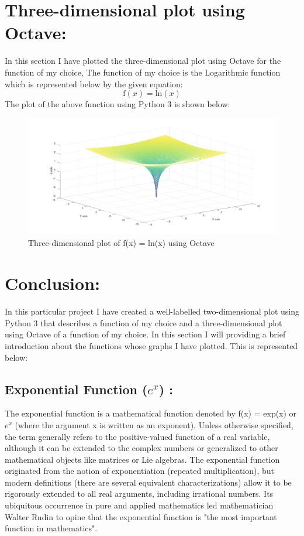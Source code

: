 \documentclass[12pt,a4paper]{article}
\begin{document}
\section{Three-dimensional plot using Octave:}
In this section I have plotted the three-dimensional plot using Octave for the function of my choice, The function of my choice is the Logarithmic function which is represented below by the given equation:
\begin{equation}
    \text{f}(x) = \text{ln}(x)
\end{equation}
The plot of the above function using Python 3 is shown below:
\begin{figure}[!ht]
	\begin{center}
			\includegraphics[scale=0.8]{Figure_2.png}
	\end{center}
	\caption{Three-dimensional plot of f(x) = ln(x) using Octave}
\end{figure}
\section{Conclusion:}
In this particular project I have created a well-labelled two-dimensional plot using Python 3 that describes a function of my choice and a three-dimensional plot using Octave of a function of my choice. In this section I will providing a brief introduction about the functions whose graphs I have plotted. This is represented below:
\subsection{Exponential Function ($e^x$) :}
The exponential function is a mathematical function denoted by f(x) = exp(x) or $e^x$ (where the argument x is written as an exponent). Unless otherwise specified, the term generally refers to the positive-valued function of a real variable, although it can be extended to the complex numbers or generalized to other mathematical objects like matrices or Lie algebras. The exponential function originated from the notion of exponentiation (repeated multiplication), but modern definitions (there are several equivalent characterizations) allow it to be rigorously extended to all real arguments, including irrational numbers. Its ubiquitous occurrence in pure and applied mathematics led mathematician Walter Rudin to opine that the exponential function is "the most important function in mathematics".
\end{document}
